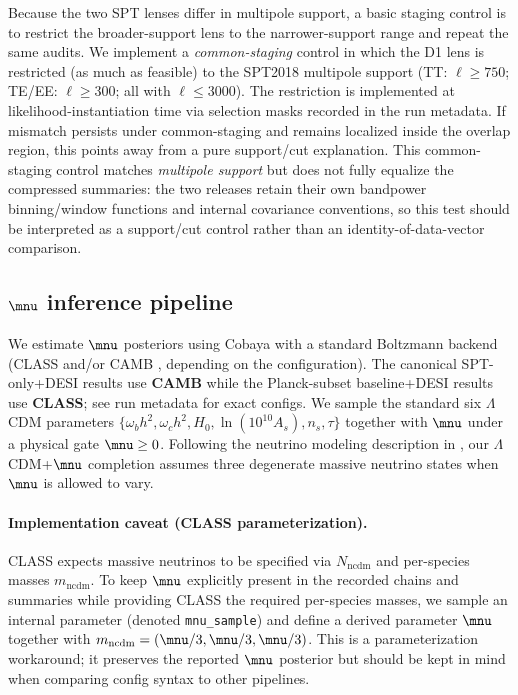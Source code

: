 Because the two SPT lenses differ in multipole support, a basic staging control is to restrict the broader-support lens to the narrower-support range and repeat the same audits. We implement a \emph{common-staging} control in which the D1 lens is restricted (as much as feasible) to the SPT2018 multipole support (TT: $\ell\ge 750$; TE/EE: $\ell\ge 300$; all with $\ell\le 3000$). The restriction is implemented at likelihood-instantiation time via selection masks recorded in the run metadata. If mismatch persists under common-staging and remains localized inside the overlap region, this points away from a pure support/cut explanation.
This common-staging control matches \emph{multipole support} but does not fully equalize the compressed summaries: the two releases retain their own bandpower binning/window functions and internal covariance conventions, so this test should be interpreted as a support/cut control rather than an identity-of-data-vector comparison.

\subsection{$\mnu$ inference pipeline}
\label{sec:mnu-inference}

We estimate $\mnu$ posteriors using Cobaya \cite{cobaya} with a standard Boltzmann backend (CLASS \cite{class} and/or CAMB \cite{camb}, depending on the configuration). The canonical SPT-only+DESI results use \textbf{CAMB} while the Planck-subset baseline+DESI results use \textbf{CLASS}; see run metadata for exact configs. We sample the standard six $\Lambda$CDM parameters $\{\omega_b h^2, \omega_c h^2, H_0, \ln(10^{10}A_s), n_s, \tau\}$ together with $\mnu$ under a physical gate $\mnu\ge 0$. Following the neutrino modeling description in \cite{arxiv2601_16277}, our $\Lambda$CDM+$\mnu$ completion assumes three degenerate massive neutrino states when $\mnu$ is allowed to vary.

\paragraph{Implementation caveat (CLASS parameterization).}
CLASS expects massive neutrinos to be specified via $N_{\mathrm{ncdm}}$ and per-species masses $m_{\mathrm{ncdm}}$. To keep $\mnu$ explicitly present in the recorded chains and summaries while providing CLASS the required per-species masses, we sample an internal parameter (denoted \texttt{mnu\_sample}) and define a derived parameter $\mnu$ together with $m_{\mathrm{ncdm}}=(\mnu/3,\mnu/3,\mnu/3)$. This is a parameterization workaround; it preserves the reported $\mnu$ posterior but should be kept in mind when comparing config syntax to other pipelines.


